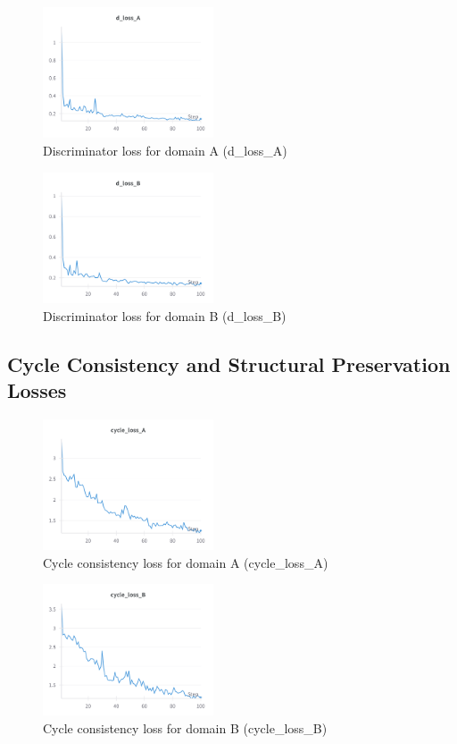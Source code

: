 \documentclass[twocolumn,superscriptaddress,aps]{revtex4-1}
\begin{document}
\begin{figure}[H]
\centering
\includegraphics[width=0.45\textwidth]{assets/d_loss_A.png}
\caption{Discriminator loss for domain A (d\_loss\_A)}
\label{fig:d_loss_A}
\end{figure}

\begin{figure}[H]
\centering
\includegraphics[width=0.45\textwidth]{assets/d_loss_B.png}
\caption{Discriminator loss for domain B (d\_loss\_B)}
\label{fig:d_loss_B}
\end{figure}

\subsection{Cycle Consistency and Structural Preservation Losses}

\begin{figure}[H]
\centering
\includegraphics[width=0.45\textwidth]{assets/cycle_loss_A.png}
\caption{Cycle consistency loss for domain A (cycle\_loss\_A)}
\label{fig:cycle_loss_A}
\end{figure}

\begin{figure}[H]
\centering
\includegraphics[width=0.45\textwidth]{assets/cycle_loss_B.png}
\caption{Cycle consistency loss for domain B (cycle\_loss\_B)}
\label{fig:cycle_loss_B}
\end{figure}
\end{document}
